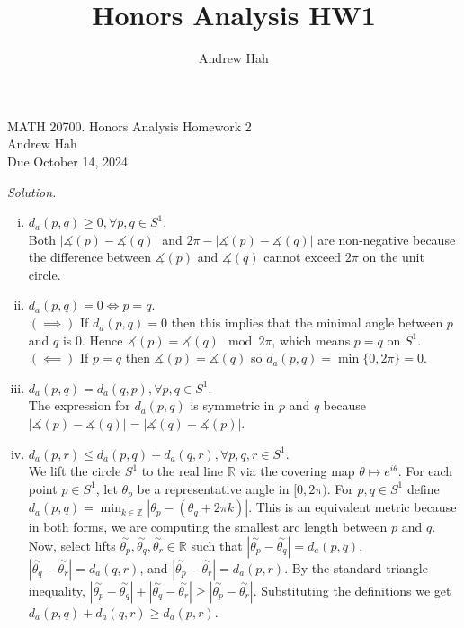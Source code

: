 \documentclass[12pt]{article}
\title{Honors Analysis HW1}
\author{Andrew Hah}
\newcommand{\bbR}{\mathbb{R}}
\newcommand{\bbZ}{\mathbb{Z}}
\renewcommand{\_}[1]{\underline{ #1 }}
\theoremstyle{definition}
\newenvironment{exercise}[1]
  {\renewcommand\theinnercustomthm{#1}\innercustomthm}
  {\endinnercustomthm}
\newenvironment{solution}{\par\noindent\textit{Solution.}\ }{\par}
\numberwithin{equation}{subsection}
\begin{document}
\pagestyle{plain}
\begin{center}
{\Large MATH 20700. Honors Analysis Homework 2} \\ 
\vspace{.2in}  
Andrew Hah \\
Due October 14, 2024
\end{center}

\begin{exercise}{5}
    \begin{solution}
        \begin{enumerate} [(i)]
            \item $d_a (p, q) \ge 0, \forall p, q \in S^1$. \\
            Both $|\measuredangle (p) - \measuredangle (q)|$ and $2\pi - |\measuredangle (p) - \measuredangle (q)|$ are non-negative because the difference between $\measuredangle (p)$ and $\measuredangle (q)$ cannot exceed $2\pi$ on the unit circle. 
            \item $d_a(p, q) = 0 \iff p = q$. \\
            $(\implies)$ If $d_a(p, q) = 0$ then this implies that the minimal angle between $p$ and $q$ is 0. Hence $\measuredangle (p) = \measuredangle (q) \mod 2\pi$, which means $p = q$ on $S^1$. \\
            $(\impliedby)$ If $p = q$ then $\measuredangle (p) = \measuredangle (q)$ so $d_a (p, q) = \min \{ 0, 2\pi \} = 0$. 
            \item $d_a (p, q) = d_a (q, p), \forall p, q \in S^1$. \\
            The expression for $d_a(p, q)$ is symmetric in $p$ and $q$ because $|\measuredangle (p) - \measuredangle (q)| = |\measuredangle (q) - \measuredangle (p)|$. 
            \item $d_a(p, r) \le d_a(p, q) + d_a(q, r), \forall p, q, r \in S^1$. \\
            We lift the circle $S^1$ to the real line $\bbR$ via the covering map $\theta \mapsto e^{i \theta}$. For each point $p \in S^1$, let $\theta_p$ be a representative angle in $[0, 2 \pi)$. For $p, q \in S^1$ define $d_a (p, q) = \min_{k \in \bbZ} |\theta_p - (\theta_q + 2\pi k)|$. This is an equivalent metric because in both forms, we are computing the smallest arc length between $p$ and $q$. Now, select lifts $\overset{\sim}{\theta_p}, \overset{\sim}{\theta_q}, \overset{\sim}{\theta_r} \in \bbR$ such that $|\overset{\sim}{\theta_p} - \overset{\sim}{\theta_q}| = d_a(p, q)$, $|\overset{\sim}{\theta_q} - \overset{\sim}{\theta_r}| = d_a(q, r)$, and $|\overset{\sim}{\theta_p} - \overset{\sim}{\theta_r}| = d_a (p, r)$. By the standard triangle inequality, $|\overset{\sim}{\theta_p} - \overset{\sim}{\theta_q}| + |\overset{\sim}{\theta_q} - \overset{\sim}{\theta_r}| \ge |\overset{\sim}{\theta_p} - \overset{\sim}{\theta_r}|$. Substituting the definitions we get $d_a (p, q) + d_a (q, r) \ge d_a (p, r)$. 
        \end{enumerate}
    \end{solution}
\end{exercise}
\end{document}

